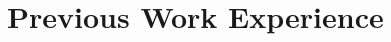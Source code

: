 \documentclass[10pt,letterpaper]{article}
\renewenvironment{itemize}{
  \begin{list}{}{
    \setlength{\leftmargin}{1.5em}
  }
}{
  \end{list}
}
\begin{document}

\section*{Previous Work Experience}
\end{document}
